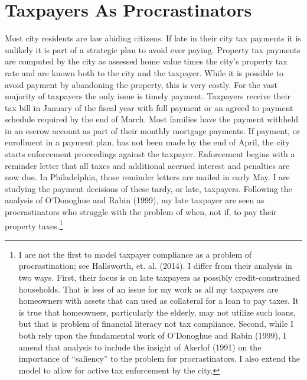 
\section{Taxpayers As Procrastinators}

Most city residents are law abiding citizens.  If late in their city
tax payments it is unlikely it is part of a strategic plan to avoid
ever paying.  Property tax payments are computed by the city as assessed
home value times the city's property tax rate and are known both to
the city and the taxpayer.  While it is possible to avoid payment by
abandoning the property, this is very costly.  For the vast majority
of taxpayers the only issue is timely payment.  Taxpayers receive
their tax bill in January of the fiscal year with full payment or an
agreed to payment schedule required by the end of March.  Most
families have the payment withheld in an escrow account as part of
their monthly mortgage payments.  If payment, or enrollment in a
payment plan, has not been made by the end of April, the city starts
enforcement proceedings against the taxpayer.  Enforcement begins with
a reminder letter that all taxes and additional accrued interest and
penalties are now due.  In Philadelphia, those reminder letters are
mailed in early May.  I are studying the payment decisions of these
tardy, or late, taxpayers. Following the analysis of O'Donoghue
and Rabin (1999), my late taxpayer are seen as procrastinators who
struggle with the problem of when, not if, to pay their property
taxes.\footnote{I are not the first to model taxpayer compliance as a
  problem of procrastination; see Hallsworth, et. al.  (2014). I
  differ from their analysis in two ways.  First, their focus is on
  late taxpayers as possibly credit-constrained households.  That is
  less of an issue for my work as all my taxpayers are homeowners
  with assets that can used as collateral for a loan to pay taxes.  It
  is true that homeowners, particularly the elderly, may not utilize
  such loans, but that is problem of financial literacy not tax
  compliance.  Second, while I both rely upon the fundamental work of
  O'Donoghue and Rabin (1999), I amend that analysis to include the
  insight of Akerlof (1991) on the importance of ``saliency'' to the
  problem for procrastinators. I also extend the model to allow for
  active tax enforcement by the city.}

